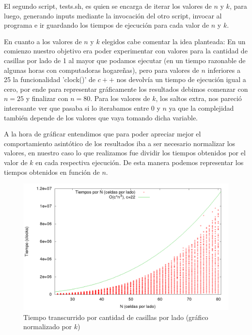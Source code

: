 El segundo script, tests.sh, es quien se encarga de iterar los valores de $n$ y $k$, para luego, generando inputs mediante la invocaci\'on del otro script, invocar al programa e ir guardando los tiempos de ejecuci\'on para cada valor de $n$ y $k$.

En cuanto a los valores de $n$ y $k$ elegidos cabe comentar la idea planteada: En un comienzo nuestro objetivo era poder experimentar con valores para la cantidad de casillas por lado de 1 al mayor que podamos ejecutar (en un tiempo razonable de algunas horas con computadoras hogare\~nas), pero para valores de $n$ inferiores a 25 la funcionalidad 'clock()' de $c++$ nos devolv\'ia un tiempo de ejecuci\'on igual a cero, por ende para representar gr\'aficamente los resultados debimos comenzar con $n=25$ y finalizar con $n=80$. 
	Para los valores de $k$, los saltos extra, nos pareci\'o interesante ver que pasaba si lo iterabamos entre 0 y $n$ ya que la complejidad tambi\'en depende de los valores que vaya tomando dicha variable.

A la hora de gr\'aficar entendimos que para poder apreciar mejor el comportamiento asint\'otico de los resultados iba a ser necesario normalizar los valores, en nuestro caso lo que realizamos fue dividir los tiempos obtenidos por el valor de $k$ en cada respectiva ejecuci\'on. De esta manera podemos representar los tiempos obtenidos en funci\'on de $n$.

\newpage

\begin{center}
\begin{figure}[h!]
\includegraphics[scale=0.4]{./img/ej3_chart_normalizado.png}
\caption{Tiempo transcurrido por cantidad de casillas por lado (gr\'afico normalizado por $k$)}
\end{figure}
\end{center}


